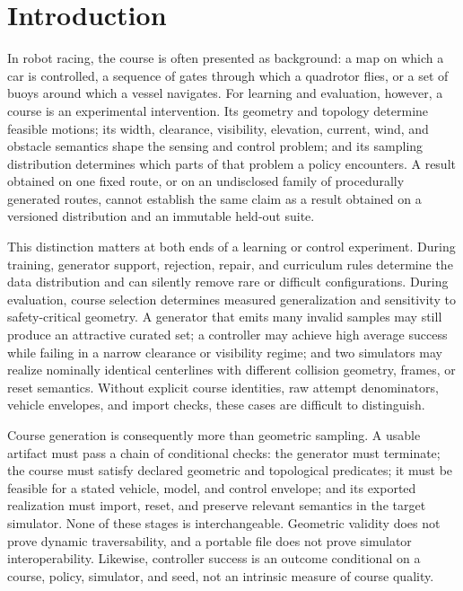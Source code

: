 \section{Introduction}
\label{sec:introduction}

In robot racing, the course is often presented as background: a map on which a car is
controlled, a sequence of gates through which a quadrotor flies, or a set of buoys
around which a vessel navigates. For learning and evaluation, however, a course is an
experimental intervention. Its geometry and topology determine feasible motions; its
width, clearance, visibility, elevation, current, wind, and obstacle semantics shape
the sensing and control problem; and its sampling distribution determines which parts
of that problem a policy encounters. A result obtained on one fixed route, or on an
undisclosed family of procedurally generated routes, cannot establish the same claim
as a result obtained on a versioned distribution and an immutable held-out suite.

This distinction matters at both ends of a learning or control experiment. During
training, generator support, rejection, repair, and curriculum rules determine the
data distribution and can silently remove rare or difficult configurations. During
evaluation, course selection determines measured generalization and sensitivity to
safety-critical geometry. A generator that emits many invalid samples may still
produce an attractive curated set; a controller may achieve high average success
while failing in a narrow clearance or visibility regime; and two simulators may
realize nominally identical centerlines with different collision geometry, frames, or
reset semantics. Without explicit course identities, raw attempt denominators,
vehicle envelopes, and import checks, these cases are difficult to distinguish.

Course generation is consequently more than geometric sampling. A usable artifact
must pass a chain of conditional checks: the generator must terminate; the course must
satisfy declared geometric and topological predicates; it must be feasible for a
stated vehicle, model, and control envelope; and its exported realization must import,
reset, and preserve relevant semantics in the target simulator. None of these stages
is interchangeable. Geometric validity does not prove dynamic traversability, and a
portable file does not prove simulator interoperability. Likewise, controller success
is an outcome conditional on a course, policy, simulator, and seed, not an intrinsic
measure of course quality.

